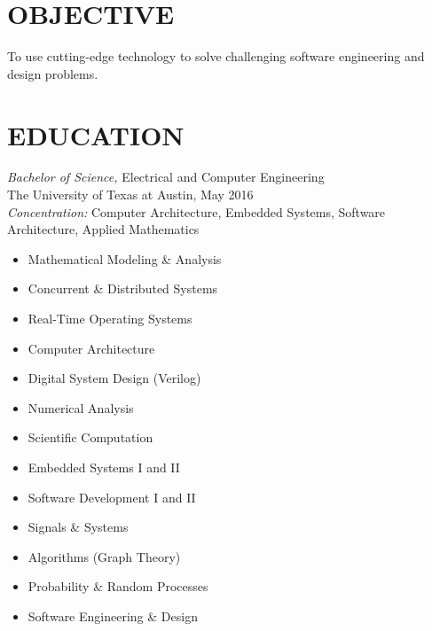 \documentclass[margin]{res}
\begin{document}
\vspace{-3.5em}
\address{6109 Shadow Valley Dr Unit A\\
  Austin, TX 78731}
\address{\href{mailto:hershal.bhave@gmail.com}{\ul{\texttt{hershal.bhave@gmail.com}}} \\
  \href{https://github.com/hershal}{\ul{\texttt{github.com/hershal}}}}
\begin{resume}
  \section{OBJECTIVE}
  To use cutting-edge technology to solve challenging software engineering and
  design problems.
  \section{EDUCATION}
  {\sl Bachelor of Science,} Electrical and Computer Engineering \\
  The University of Texas at Austin, May 2016 \\
  {\sl Concentration:} Computer Architecture, Embedded Systems, Software Architecture,
  Applied Mathematics

  \vspace{-.5em}
  \begin{multicols}{2}
    \begin{itemize}
    \item Mathematical Modeling \& Analysis
    \item Concurrent \& Distributed Systems
    \item Real-Time Operating Systems
    \item Computer Architecture
    \item Digital System Design (Verilog)
    \item Numerical Analysis
    \item Scientific Computation
    \item Embedded Systems I and II
    \item Software Development I and II
    \item Signals \& Systems
    \item Algorithms (Graph Theory)
    \item Probability \& Random Processes
    \item Software Engineering \& Design
    \end{itemize}
  \end{multicols}


\end{resume}
\end{document}
